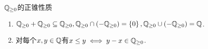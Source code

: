 \begin{proposition}{$\mathbb{Q}_{\geq 0}$的正锥性质}{}
	\begin{enumerate}
		\item $\mathbb{Q}_{\geq 0}+\mathbb{Q}_{\geq 0}\subseteq\mathbb{Q}_{\geq 0},\mathbb{Q}_{\geq 0}\cap\left(-\mathbb{Q}_{\geq 0}\right)=\left\{0\right\},\mathbb{Q}_{\geq 0}\cup\left(-\mathbb{Q}_{\geq 0}\right)=\mathbb{Q}$.
		\item 对每个$x,y\in\mathbb{Q}$有$x\leq y\iff y-x\in\mathbb{Q}_{\geq 0}$.
	\end{enumerate}
\end{proposition}






